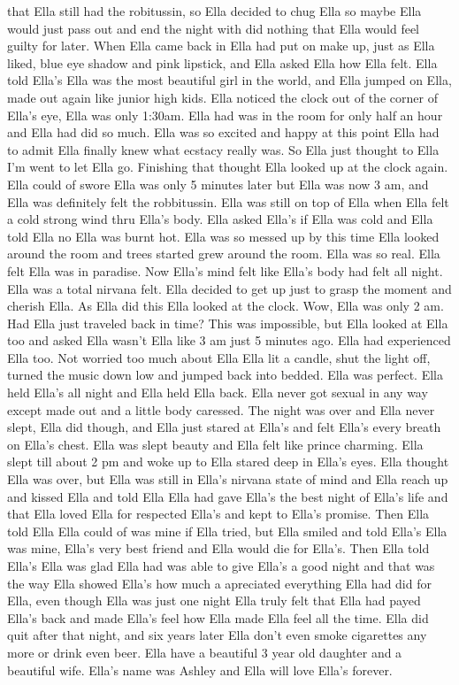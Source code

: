 \documentclass[12pt]{book}
\begin{document}
that Ella still had the robitussin, so Ella decided to chug Ella so maybe Ella would just pass out and end the night with did nothing that Ella would feel guilty for later. When Ella came back in Ella had put on make up, just as Ella liked, blue eye shadow and pink lipstick, and Ella asked Ella how Ella felt. Ella told Ella's Ella was the most beautiful girl in the world, and Ella jumped on Ella, made out again like junior high kids. Ella noticed the clock out of the corner of Ella's eye, Ella was only 1:30am. Ella had was in the room for only half an hour and Ella had did so much. Ella was so excited and happy at this point Ella had to admit Ella finally knew what ecstacy really was. So Ella just thought to Ella I'm went to let Ella go. Finishing that thought Ella looked up at the clock again. Ella could of swore Ella was only 5 minutes later but Ella was now 3 am, and Ella was definitely felt the robbitussin. Ella was still on top of Ella when Ella felt a cold strong wind thru Ella's body. Ella asked Ella's if Ella was cold and Ella told Ella no Ella was burnt hot. Ella was so messed up by this time Ella looked around the room and trees started grew around the room. Ella was so real. Ella felt Ella was in paradise. Now Ella's mind felt like Ella's body had felt all night. Ella was a total nirvana felt. Ella decided to get up just to grasp the moment and cherish Ella. As Ella did this Ella looked at the clock. Wow, Ella was only 2 am. Had Ella just traveled back in time? This was impossible, but Ella looked at Ella too and asked Ella wasn't Ella like 3 am just 5 minutes ago. Ella had experienced Ella too. Not worried too much about Ella Ella lit a candle, shut the light off, turned the music down low and jumped back into bedded. Ella was perfect. Ella held Ella's all night and Ella held Ella back. Ella never got sexual in any way except made out and a little body caressed. The night was over and Ella never slept, Ella did though, and Ella just stared at Ella's and felt Ella's every breath on Ella's chest. Ella was slept beauty and Ella felt like prince charming. Ella slept till about 2 pm and woke up to Ella stared deep in Ella's eyes. Ella thought Ella was over, but Ella was still in Ella's nirvana state of mind and Ella reach up and kissed Ella and told Ella Ella had gave Ella's the best night of Ella's life and that Ella loved Ella for respected Ella's and kept to Ella's promise. Then Ella told Ella Ella could of was mine if Ella tried, but Ella smiled and told Ella's Ella was mine, Ella's very best friend and Ella would die for Ella's. Then Ella told Ella's Ella was glad Ella had was able to give Ella's a good night and that was the way Ella showed Ella's how much a apreciated everything Ella had did for Ella, even though Ella was just one night Ella truly felt that Ella had payed Ella's back and made Ella's feel how Ella made Ella feel all the time. Ella did quit after that night, and six years later Ella don't even smoke cigarettes any more or drink even beer. Ella have a beautiful 3 year old daughter and a beautiful wife. Ella's name was Ashley and Ella will love Ella's forever.
\end{document}
